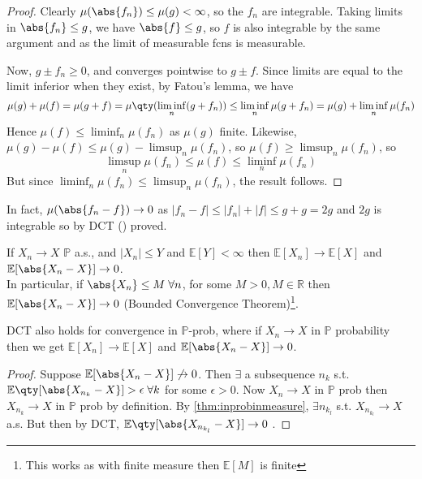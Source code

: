 \begin{proof}
	Clearly $\mu(\abs{f_n}) \leq \mu(g) < \infty$, so the $f_n$ are integrable.
	Taking limits in $\abs{f_n} \leq g$, we have $\abs{f} \leq g$, so $f$ is also integrable by the same argument and as the limit of measurable fcns is measurable.

	Now, $g \pm f_n \geq 0$, and converges pointwise to $g \pm f$.
	Since limits are equal to the limit inferior when they exist, by Fatou's lemma, we have
	\[ \mu(g) + \mu(f) = \mu(g + f) = \mu\qty(\liminf_n (g + f_n)) \leq \liminf_n \mu(g + f_n) = \mu(g) + \liminf_n \mu(f_n) \]
	Hence $\mu(f) \leq \liminf_n \mu(f_n)$ as $\mu(g)$ finite.
	Likewise, $\mu(g) - \mu(f) \leq \mu(g) - \limsup_n \mu(f_n)$, so $\mu(f) \geq \limsup_n \mu(f_n)$, so
	\[ \limsup_n \mu(f_n) \leq \mu(f) \leq \liminf_n \mu(f_n) \]
	But since $\liminf_n \mu(f_n) \leq \limsup_n \mu(f_n)$, the result follows.
\end{proof}

\begin{remark}
	In fact, $\mu(\abs{f_n - f}) \to 0$ as $|f_n - f| \leq |f_n| + |f| \leq g + g = 2g$ and $2g$ is integrable so by DCT () proved.

	If $X_n \to X$ $\mathbb{P}$ a.s., and $|X_n| \leq Y$ and $\mathbb{E}[Y] < \infty$ then $\mathbb{E}[X_n] \to \mathbb{E}[X]$ and $\mathbb{E}[\abs{X_n - X}] \to 0$. \\
	In particular, if $\abs{X_n} \leq M \; \forall n$, for some $M > 0, M \in \mathbb{R}$ then $\mathbb{E}[\abs{X_n - X}] \to 0$ (Bounded Convergence Theorem)\footnote{This works as with finite measure then $\mathbb{E}[M]$ is finite}.
\end{remark}

\begin{remark}
	DCT also holds for convergence in $\mathbb{P}$-prob, where if $X_n \to X$ in $\mathbb{P}$ probability then we get $\mathbb{E}[X_n] \to \mathbb{E}[X]$ and $\mathbb{E}[\abs{X_n - X}] \to 0$.
\end{remark}

\begin{proof}
	Suppose $\mathbb{E}[\abs{X_n - X}] \not\to 0$.
	Then $\exists$ a subsequence $n_k$ s.t. $\mathbb{E}\qty[\abs{X_{n_k} - X}] > \epsilon \; \forall k$ for some $\epsilon > 0$.
	Now $X_n \to X$ in $\mathbb{P}$ prob then $X_{n_k} \to X$ in $\mathbb{P}$ prob by definition.
	By \cref{thm:inprobinmeasure}, $\exists n_{k_{l}}$ s.t. $X_{n_{k_l}} \to X$ a.s.
	But then by DCT, $\mathbb{E}\qty[\abs{X_{n_{k_l}} - X}] \to 0$ \Lightning.
\end{proof}

